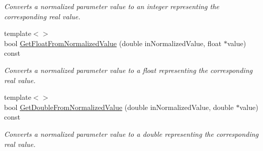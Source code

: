 \begin{DoxyCompactItemize}
\begin{DoxyCompactList}\small\item\em Converts a normalized parameter value to an integer representing the corresponding real value. \end{DoxyCompactList}\item 
{\footnotesize template$<$$>$ }\\bool \hyperlink{a00033_aa5ba79df5fd472494ec127372498b48c}{Get\+Float\+From\+Normalized\+Value} (double in\+Normalized\+Value, float $\ast$value) const
\begin{DoxyCompactList}\small\item\em Converts a normalized parameter value to a float representing the corresponding real value. \end{DoxyCompactList}\item 
{\footnotesize template$<$$>$ }\\bool \hyperlink{a00033_a75290a4d4e7781cbcf4af56aff8be693}{Get\+Double\+From\+Normalized\+Value} (double in\+Normalized\+Value, double $\ast$value) const
\begin{DoxyCompactList}\small\item\em Converts a normalized parameter value to a double representing the corresponding real value. \end{DoxyCompactList}\end{DoxyCompactItemize}
